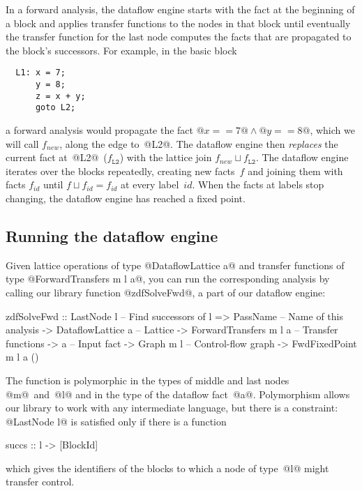 \documentclass[blockstyle,preprint,natbib,nocopyrightspace]{sigplanconf}
\newcommand\join{\sqcup}
\def\authornote#1{\unskip\relax}
\newcommand{\norman}[1]{\authornote{NR: #1}}
\let\remark\norman
\newcommand\seclabel[1]{\label{sec:#1}}
\begin{document}
In a forward analysis, the dataflow engine starts with the fact at the
beginning of a block and applies transfer functions to the nodes in
that block until eventually the transfer function for the last node
computes the facts that are propagated to the block's successors.
For example, in the basic block
\begin{verbatim}
  L1: x = 7;
      y = 8;
      z = x + y;
      goto L2;
\end{verbatim}
a forward analysis would propagate the fact 
$@x == 7@ \land @y == 8@$, which we will call $f_{\mathit{new}}$,
along the edge to~@L2@. 
The dataflow engine then \emph{replaces} the current fact
at~@L2@~($f_{\mathtt{L2}}$) with the lattice join $f_{\mathit{new}}
\join f_{\mathtt{L2}}$. 
The dataflow engine iterates over the blocks repeatedly, creating new
facts~$f$ and joining them with facts $f_{\mathit{id}}$ until
\mbox{$f \join f_{\mathit{id}} = f_{\mathit{id}}$} at every label~$\mathit{id}$.
When the facts at labels stop changing, the dataflow
engine has reached a fixed point.




\subsection{Running the dataflow engine}

\seclabel{zdfSolveFwd}

Given lattice operations of type @DataflowLattice a@
and transfer functions of type @ForwardTransfers m l a@,
you can run the corresponding analysis by calling our library
function @zdfSolveFwd@, a part of our dataflow engine:
\begin{code}
 zdfSolveFwd 
  :: LastNode l             -- Find successors of l
  => PassName               -- Name of this analysis
  -> DataflowLattice a      -- Lattice
  -> ForwardTransfers m l a -- Transfer functions
  -> a                      -- Input fact
  -> Graph m l              -- Control-flow graph
  -> FwdFixedPoint m l a ()
\end{code}
The function is polymorphic in the types of middle and last nodes
@m@~and~@l@ and in the type of the dataflow fact~@a@.
Polymorphism allows our library to work with any intermediate
language, but there is a constraint: @LastNode l@ is satisfied
only if there is a function 
\begin{code}
  succs :: l -> [BlockId]
\end{code}
which gives the identifiers of the blocks to which a node of type~@l@
might transfer control.
\remark{Would like to have the more limited constraint
@HavingSuccessors l@, but this will mean additional complexity in the
implementation.}
\end{document}
